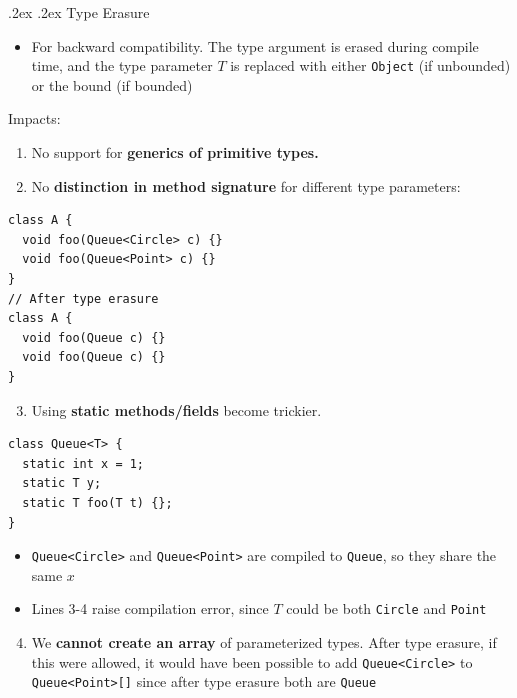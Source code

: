 \documentclass[10pt,landscape,a4paper]{article}
\makeatletter
\renewcommand{\subsubsection}{\@startsection{subsubsection}{1}{0mm}%
                                {.2ex}%
                                {.2ex}%
                                {\rmfamily\bfseries}}
\makeatother
\begin{document}
\begin{multicols*}{3}
    \subsubsection{Type Erasure}
    \begin{itemize}
      \item For backward compatibility. The type argument is erased during compile time, and the type parameter $T$ is replaced with either \texttt{Object} (if unbounded) or the bound (if bounded)
    \end{itemize}
    Impacts:
      \begin{enumerate}
        \item No support for \textbf{generics of primitive types.}
        \item No \textbf{distinction in method signature} for different type parameters:
      \end{enumerate}
        \begin{verbatim}
class A {
  void foo(Queue<Circle> c) {}
  void foo(Queue<Point> c) {}
}
// After type erasure
class A {
  void foo(Queue c) {}
  void foo(Queue c) {}
}
        \end{verbatim}
        \begin{enumerate}
          \setcounter{enumi}{2}
          \item Using \textbf{static methods/fields} become trickier.
        \end{enumerate}
        \begin{verbatim}
class Queue<T> {
  static int x = 1;
  static T y;
  static T foo(T t) {};
}
        \end{verbatim}
        \begin{itemize}
          \item \texttt{Queue<Circle>} and \texttt{Queue<Point>} are compiled to \texttt{Queue}, so they share the same $x$
          \item Lines 3-4 raise compilation error, since $T$ could be both \texttt{Circle} and \texttt{Point}
        \end{itemize}
      \begin{enumerate}
        \setcounter{enumi}{3}
        \item We \textbf{cannot create an array} of parameterized types. After type erasure, if this were allowed, it would have been possible to add \texttt{Queue<Circle>} to \texttt{Queue<Point>[]} since after type erasure both are \texttt{Queue}
      \end{enumerate}

\end{multicols*}
\end{document}
